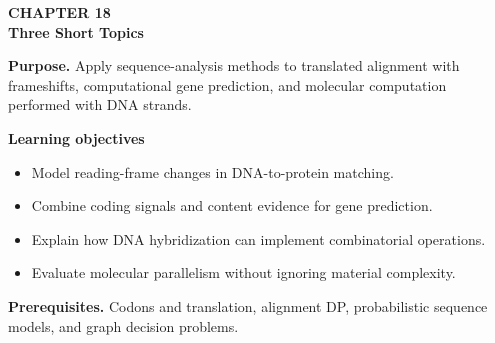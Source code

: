 \documentclass[11pt]{article}
\begin{document}
\begin{tcolorbox}[
  enhanced,breakable,colback=Primary!4,colframe=Primary,boxrule=0.9pt,
  arc=2mm,left=3mm,right=3mm,top=2.5mm,bottom=2.5mm]
{\sffamily\color{Accent}\bfseries CHAPTER 18}\\[-1pt]
{\sffamily\LARGE\bfseries\color{Primary} Three Short Topics}

\vspace{2pt}
\textbf{Purpose.} Apply sequence-analysis methods to translated alignment with frameshifts, computational gene prediction, and molecular computation performed with DNA strands.

\textbf{Learning objectives}
\begin{itemize}
  \item Model reading-frame changes in DNA-to-protein matching.
  \item Combine coding signals and content evidence for gene prediction.
  \item Explain how DNA hybridization can implement combinatorial operations.
  \item Evaluate molecular parallelism without ignoring material complexity.
\end{itemize}

\textbf{Prerequisites.} Codons and translation, alignment DP, probabilistic sequence models, and graph decision problems.
\end{tcolorbox}
\end{document}
